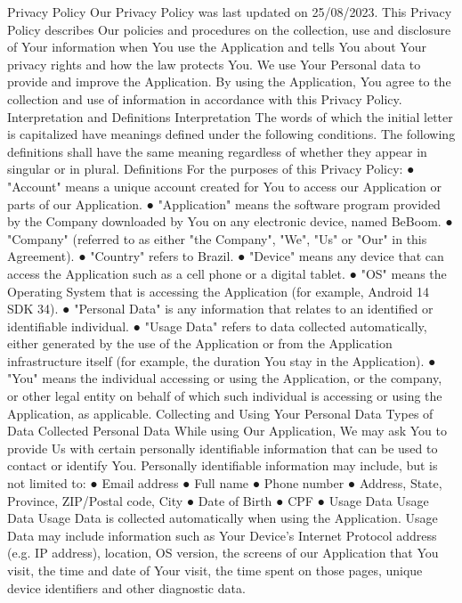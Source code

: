 Privacy Policy
Our Privacy Policy was last updated on 25/08/2023. This Privacy Policy describes Our policies and procedures on the collection, use and disclosure of Your information when You use the Application and tells You about Your privacy rights and how the law protects You.
We use Your Personal data to provide and improve the Application. By using the Application, You agree to the collection and use of information in accordance with this Privacy Policy.
Interpretation and Definitions
Interpretation
The words of which the initial letter is capitalized have meanings defined under the following conditions. The following definitions shall have the same meaning regardless of whether they appear in singular or in plural.
Definitions
For the purposes of this Privacy Policy:
● "Account" means a unique account created for You to access our Application or parts of our Application.
● "Application" means the software program provided by the Company downloaded by You on any electronic device, named BeBoom.
● "Company" (referred to as either "the Company", "We", "Us" or "Our" in this Agreement).
● "Country" refers to Brazil.
● "Device" means any device that can access the Application such as a cell phone or a digital tablet.
● "OS" means the Operating System that is accessing the Application (for example, Android 14 SDK 34).
● "Personal Data" is any information that relates to an identified or identifiable individual.
● "Usage Data" refers to data collected automatically, either generated by the use of the Application or from the Application infrastructure itself (for example, the duration You stay in the Application).
● "You" means the individual accessing or using the Application, or the company, or other legal entity on behalf of which such individual is accessing or using the Application, as applicable.
Collecting and Using Your Personal Data
Types of Data Collected
Personal Data
While using Our Application, We may ask You to provide Us with certain personally identifiable information that can be used to contact or identify You. Personally identifiable information may include, but is not limited to:
● Email address 
● Full name 
● Phone number 
● Address, State, Province, ZIP/Postal code, City 
● Date of Birth
● CPF
● Usage Data
Usage Data
Usage Data is collected automatically when using the Application.
Usage Data may include information such as Your Device's Internet Protocol address (e.g. IP address), location, OS  version, the screens of our Application that You visit, the time and date of Your visit, the time spent on those pages, unique device identifiers and other diagnostic data.
